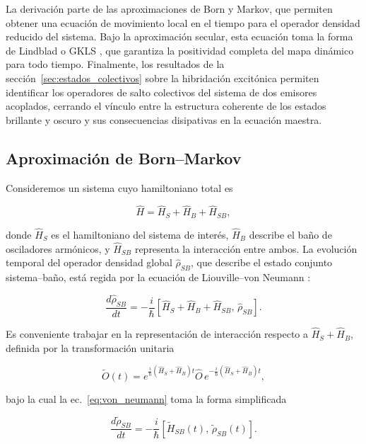 La derivación parte de las aproximaciones de Born y Markov, que permiten obtener una ecuación de movimiento local en el tiempo para el operador densidad reducido del sistema. Bajo la aproximación secular, esta ecuación toma la forma de Lindblad o GKLS \cite{lindblad1976}, que garantiza la positividad completa del mapa dinámico para todo tiempo. Finalmente, los resultados de la sección~\ref{sec:estados_colectivos} sobre la hibridación excitónica permiten identificar los operadores de salto colectivos del sistema de dos emisores acoplados, cerrando el vínculo entre la estructura coherente de los estados brillante y oscuro y sus consecuencias disipativas en la ecuación maestra.

\subsection{Aproximación de Born--Markov}
\label{sec:born_markov}

Consideremos un sistema cuyo hamiltoniano total es

\begin{equation}
	\hat{H} = \hat{H}_S + \hat{H}_B + \hat{H}_{SB},
	\label{eq:H_total_abierto}
\end{equation}

donde $\hat{H}_S$ es el hamiltoniano del sistema de interés, $\hat{H}_B$ describe el baño de osciladores armónicos, y $\hat{H}_{SB}$ representa la interacción entre ambos. La evolución temporal del operador densidad global $\hat{\rho}_{SB}$, que describe el estado conjunto sistema--baño, está regida por la ecuación de Liouville--von Neumann \cite{brasil2013}:

\begin{equation}
	\frac{d\hat{\rho}_{SB}}{dt} = -\frac{i}{\hbar}
	\left[\hat{H}_S + \hat{H}_B + \hat{H}_{SB},\,\hat{\rho}_{SB}\right].
	\label{eq:von_neumann}
\end{equation}

Es conveniente trabajar en la representación de interacción respecto a $\hat{H}_S + \hat{H}_B$, definida por la transformación unitaria

\begin{equation}
	\tilde{O}(t) = e^{\frac{i}{\hbar}(\hat{H}_S+\hat{H}_B)t}
	\hat{O}\,e^{-\frac{i}{\hbar}(\hat{H}_S+\hat{H}_B)t},
	\label{eq:rep_interaccion}
\end{equation}

bajo la cual la ec.~\eqref{eq:von_neumann} toma la forma simplificada

\begin{equation}
	\frac{d\tilde{\rho}_{SB}}{dt} = -\frac{i}{\hbar}
	\left[\tilde{H}_{SB}(t),\,\tilde{\rho}_{SB}(t)\right].
	\label{eq:von_neumann_interaccion}
\end{equation}

